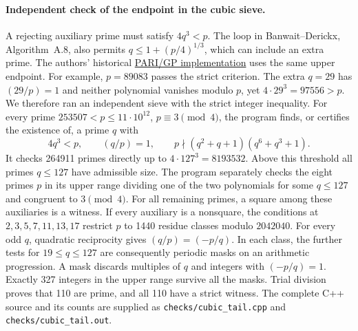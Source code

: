 \paragraph{Independent check of the endpoint in the cubic sieve.}
A rejecting auxiliary prime must satisfy $4q^3<p$.
The loop in Banwait--Derickx, Algorithm~A.8, also permits
$q\le 1+(p/4)^{1/3}$, which can include an extra prime.
The authors' historical
\href{https://github.com/isogeny-primes/isogeny-primes/blob/17bb625acaa7bf79dd047a2f01ada1ae725cc582/gp_scripts/partype2primesuniform.gp}{PARI/GP implementation}
uses the same upper endpoint. For example, $p=89083$ passes the strict
criterion. The extra $q=29$ has $(29/p)=1$ and neither polynomial vanishes
modulo $p$, yet $4\cdot29^3=97556>p$. We therefore ran an independent sieve with
the strict integer inequality. For every prime $253507<p\le 11\cdot10^{12}$,
$p\equiv3\pmod4$, the program finds, or certifies the existence of, a prime
$q$ with
\[
 4q^3<p,\qquad (q/p)=1,\qquad
 p\nmid(q^2+q+1)(q^6+q^3+1).
\]
It checks 264911 primes directly up to $4\cdot127^3=8193532$.
Above this threshold all primes $q\le127$ have admissible size. The program
separately checks the eight primes $p$ in its upper range dividing one of
the two polynomials for some $q\le127$ and congruent to $3\pmod4$.
For all remaining primes, a square among these auxiliaries is a witness.
If every auxiliary is a nonsquare, the conditions at $2,3,5,7,11,13,17$
restrict $p$ to 1440 residue classes modulo $2042040$. For every odd $q$,
quadratic reciprocity gives $(q/p)=(-p/q)$. In each class, the further
tests for $19\le q\le127$ are consequently periodic masks on an arithmetic
progression. A mask discards multiples of $q$ and integers with
$(-p/q)=1$. Exactly 327 integers in the upper range survive all the masks.
Trial division proves that 110 are prime, and all 110 have a strict witness.
The complete C++ source and its counts are supplied as
\texttt{checks/cubic\_tail.cpp} and \texttt{checks/cubic\_tail.out}.
